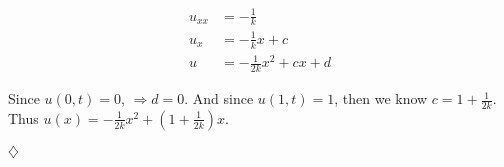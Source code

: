 \documentclass{article}
\begin{document}
\begin{align*}
u_{xx} &= -\frac{1}{k} \\
u_x &=  -\frac{1}{k}x + c \\ 
u &=  -\frac{1}{2k}x^2 + cx + d
\end{align*}

\noindent 
Since \(u(0,t) = 0\),  \(\Rightarrow  d = 0 \).  And since \( u(1,t) = 1 \), then we know \(c = 1+\frac{1}{2k}\). Thus \( u(x) =  -\frac{1}{2k}x^2 + (1+\frac{1}{2k})x \).


\begin{flushright}
\( \diamondsuit \) 
\end{flushright}
\end{document}
